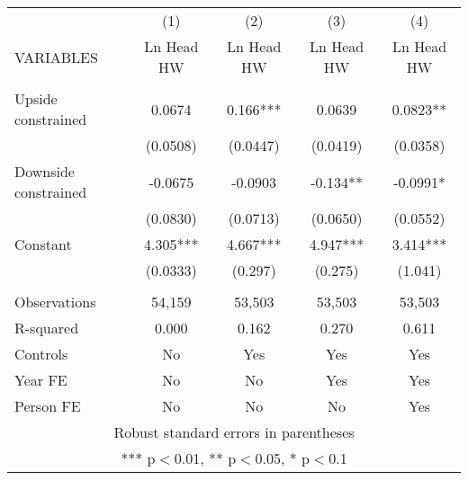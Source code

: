 \begin{tabular}{lcccc} \hline
 & (1) & (2) & (3) & (4) \\
VARIABLES & Ln Head HW & Ln Head HW & Ln Head HW & Ln Head HW \\ \hline
 &  &  &  &  \\
Upside constrained & 0.0674 & 0.166*** & 0.0639 & 0.0823** \\
 & (0.0508) & (0.0447) & (0.0419) & (0.0358) \\
Downside constrained & -0.0675 & -0.0903 & -0.134** & -0.0991* \\
 & (0.0830) & (0.0713) & (0.0650) & (0.0552) \\
Constant & 4.305*** & 4.667*** & 4.947*** & 3.414*** \\
 & (0.0333) & (0.297) & (0.275) & (1.041) \\
 &  &  &  &  \\
Observations & 54,159 & 53,503 & 53,503 & 53,503 \\
R-squared & 0.000 & 0.162 & 0.270 & 0.611 \\
Controls & No & Yes & Yes & Yes \\
Year FE & No & No & Yes & Yes \\
 Person FE & No & No & No & Yes \\ \hline
\multicolumn{5}{c}{ Robust standard errors in parentheses} \\
\multicolumn{5}{c}{ *** p$<$0.01, ** p$<$0.05, * p$<$0.1} \\
\end{tabular}
